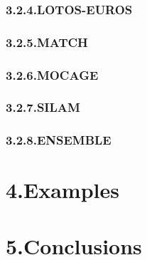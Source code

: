 \documentclass[9pt]{report}
\begin{document}
\subsubsection{3.2.4.\hspace*{0.5em}LOTOS-EUROS}\label{sec-lotos-euros}%

\subsubsection{3.2.5.\hspace*{0.5em}MATCH}\label{sec-match}%

\subsubsection{3.2.6.\hspace*{0.5em}MOCAGE}\label{sec-mocage}%

\subsubsection{3.2.7.\hspace*{0.5em}SILAM}\label{sec-silam}%

\subsubsection{3.2.8.\hspace*{0.5em}ENSEMBLE}\label{sec-ensemble}%

\section{4.\hspace*{0.5em}Examples}\label{sec-examples}%

\section{5.\hspace*{0.5em}Conclusions}\label{sec-conclusions}%
\end{document}
